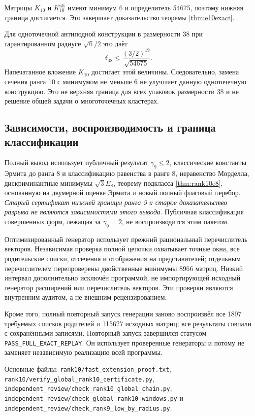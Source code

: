 \documentclass[11pt,a4paper]{article}
\theoremstyle{remark}\newtheorem{remark}[theorem]{Замечание}
\newcommand{\Kalt}{K_{10}^{\mathrm{alt}}}
\newcommand{\file}[1]{{\small\nolinkurl{#1}}}
\begin{document}
Матрицы $K_{10}$ и $\Kalt$ имеют минимум 6 и определитель 54675, поэтому нижняя граница достигается. Это завершает доказательство теоремы \ref{thm:e10exact}.

Для одноточечной антиподной конструкции в размерности 38 при гарантированном радиусе $\sqrt6/2$ это даёт
\[
\delta_{38}\le\frac{(3/2)^{19}}{\sqrt{54675}}.
\]
Напечатанное вложение $K_{10}$ достигает этой величины. Следовательно, замена сечения ранга 10 с минимумом не меньше 6 не улучшает данную одноточечную конструкцию. Это не верхняя граница для всех упаковок размерности 38 и не решение общей задачи о многоточечных кластерах.

\subsection{Зависимости, воспроизводимость и граница классификации}

Полный вывод использует публичный результат $\gamma_9\le2$, классические константы Эрмита до ранга 8 и классификацию равенства в ранге 8, неравенство Морделла, дискриминантные минимумы $\sqrt3E_8$, теорему подкласса \ref{thm:rank10e8}, основанную на двумерной оценке Эрмита и новый полный флаговый перебор. \emph{Старый сертификат нижней границы ранга 9 и старое доказательство разрыва не являются зависимостями этого вывода.} Публичная классификация совершенных форм, лежащая за $\gamma_9=2$, не воспроизводится этим пакетом.

Оптимизированный генератор использует прежний рациональный перечислитель векторов. Независимая проверка полной цепочки охватывает точные окна, все родительские списки, отсечения и отображения на представителей; отдельным перечислителем перепроверены двойственные минимумы 8966 матриц. Низкий интервал дополнительно исключён программой, не импортирующей исходный генератор расширений или перечислитель векторов. Эти проверки являются внутренним аудитом, а не внешним рецензированием.

Кроме того, полный повторный запуск генерации заново воспроизвёл все 1897 требуемых списков родителей и 115627 исходных матриц; все результаты совпали с сохранёнными записями. Повторный запуск завершился статусом \file{PASS_FULL_EXACT_REPLAY}. Он использует проверенные генераторы и потому не заменяет независимую реализацию всей программы.

Основные файлы: \file{rank10/fast_extension_proof.txt},
\file{rank10/verify_global_rank10_certificate.py},
\file{independent_review/check_rank10_global_chain.py},
\file{independent_review/check_global_rank10_windows.py} и
\file{independent_review/check_rank9_low_by_radius.py}.
\end{document}
